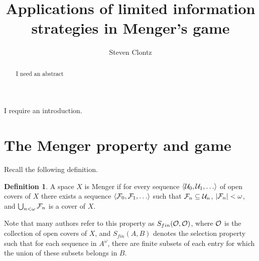 \documentclass{amsart}
\theoremstyle{definition}
\newtheorem{definition}[theorem]{Definition}
\begin{document}
\title{Applications of limited information strategies in Menger's game}




\author{Steven Clontz}
\address{Department of Mathematics and Statistics, UNC Charlotte,
Charlotte, NC 28262}




\begin{abstract}
  I need an abstract
\end{abstract}


\maketitle

I require an introduction.

\section{The Menger property and game}

Recall the following definition.

\begin{definition}
  A space \(X\) is Menger if for every sequence \(\<\mc U_0,\mc U_1,\dots\>\)
  of open covers of \(X\) there exists a sequence
  \(\<\mc F_0,\mc F_1,\dots\>\) such that \(\mathcal{F}_n\subseteq \mathcal{U}_n\),
  \(|\mathcal{F}_n|<\omega\), and \(\bigcup_{n<\omega}\mathcal{F}_n\) is a cover of \(X\).
\end{definition}

Note that many authors refer to this property as \(S_{fin}(\mathcal{O},\mathcal{O})\),
where \(\mathcal{O}\) is the collection of open covers of \(X\), and
\(S_{fin}(A,B)\) denotes the selection property such that for each
sequence in \(A^\omega\), there are finite subsets of each entry for which
the union of these subsets belongs in \(B\).
\end{document}
